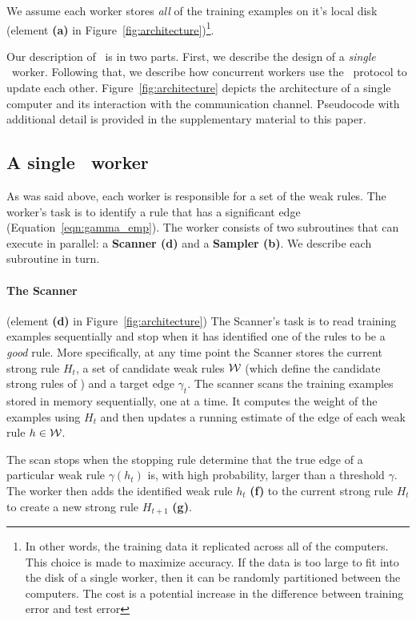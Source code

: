 We assume each worker stores {\em all} of the training examples
on it's local disk (element {\bf (a)} in Figure~\ref{fig:architecture})\footnote{In other
  words, the training data it replicated across all of the
  computers. This choice is made to maximize accuracy. If the data is
  too large to fit into the disk of a single worker, then it can be
  randomly partitioned between the computers. The cost is a potential increase
  in the difference between training error and test error}.

Our description of \Sparrow\ is in two parts. First, we describe the
design of a {\em single} \Sparrow\ worker. Following that, we describe
how concurrent workers use the \tmsn\ protocol to update each
other. Figure~\ref{fig:architecture} depicts the architecture of a
single computer and its interaction with the communication
channel. Pseudocode with additional detail is provided in the
supplementary material to this paper.

\subsection{A single \Sparrow\ worker}
\label{sec:single_worker}
As was said above, each worker is responsible for a set of the weak
rules.  The worker's task is to identify a rule that has a significant
edge (Equation~\ref{eqn:gamma_emp}). The worker consists of two
subroutines that can execute in parallel: a {\bf Scanner (d)} and a
{\bf Sampler (b)}. We describe each subroutine in turn.
\paragraph*{The Scanner}(element {\bf (d)} in
Figure~\ref{fig:architecture})
The Scanner's task is to read training examples sequentially and stop
when it has identified one of the rules to be a {\em good} rule. More
specifically, at any time point the Scanner stores the current strong
rule $H_t$, a set of candidate weak rules ${\cal W}$ (which
define the candidate strong rules of \tmsn) and a target
edge $\gamma_t$. The scanner scans the training examples stored in
memory sequentially, one at a time. It computes the weight of the
examples using $H_t$ and then updates a running estimate of the edge
of each weak rule $h \in {\cal W}$.

The scan stops when the stopping rule determine that
the true edge of a particular weak rule
$\gamma(h_t)$ is, with high probability,
larger than a threshold $\gamma$. The
worker then adds the identified weak rule $h_t$ {\bf (f)} to the current
strong rule $H_t$ to create a new strong rule $H_{t+1}$ {\bf (g)}.

